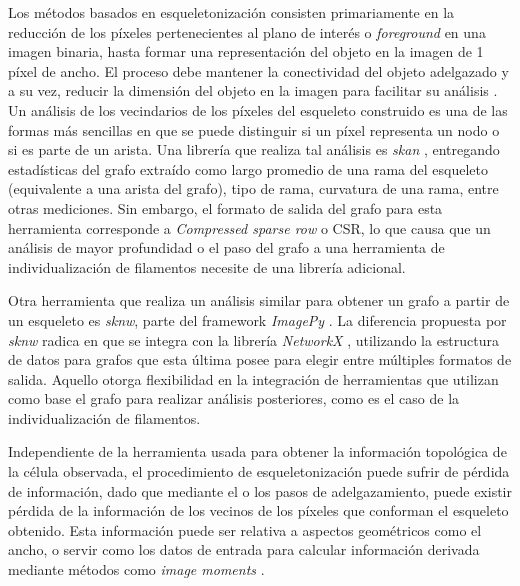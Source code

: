 Los m\'etodos basados en esqueletonizaci\'on consisten primariamente en la reducci\'on de los p\'ixeles pertenecientes al plano de inter\'es o {\it foreground} en una imagen binaria, hasta formar una representaci\'on del objeto en la imagen de 1 p\'ixel de ancho. El proceso debe mantener la conectividad del objeto adelgazado y a su vez, reducir la dimensi\'on del objeto en la imagen para facilitar su an\'alisis \citep{saha2017skeletonization}. Un an\'alisis de los vecindarios de los p\'ixeles del esqueleto construido es una de las formas m\'as sencillas en que se puede distinguir si un p\'ixel representa un nodo o si es parte de un arista. Una librer\'ia que realiza tal an\'alisis es {\it skan} \citep{nunez2018new}, entregando estad\'isticas del grafo extra\'ido como largo promedio de una rama del esqueleto (equivalente a una arista del grafo), tipo de rama, curvatura de una rama, entre otras mediciones. Sin embargo, el formato de salida del grafo para esta herramienta corresponde a {\it Compressed sparse row} o CSR, lo que causa que un an\'alisis de mayor profundidad o el paso del grafo a una herramienta de individualizaci\'on de filamentos necesite de una librer\'ia adicional. 


Otra herramienta que realiza un an\'alisis similar para obtener un grafo a partir de un esqueleto es {\it sknw}, parte del framework {\it ImagePy} \citep{wang2018imagepy}. La diferencia propuesta por {\it sknw} radica en que se integra con la librer\'ia {\it NetworkX} \citep{hagberg2008exploring}, utilizando la estructura de datos para grafos que esta \'ultima posee para elegir entre m\'ultiples formatos de salida. Aquello otorga flexibilidad en la integraci\'on de herramientas que utilizan como base el grafo para realizar an\'alisis posteriores, como es el caso de la individualizaci\'on de filamentos.


Independiente de la herramienta usada para obtener la informaci\'on topol\'ogica de la c\'elula observada, el procedimiento de esqueletonizaci\'on puede sufrir de p\'erdida de informaci\'on, dado que mediante el o los pasos de adelgazamiento, puede existir p\'erdida de la informaci\'on de los vecinos de los p\'ixeles que conforman el esqueleto obtenido. Esta informaci\'on puede ser relativa a aspectos geom\'etricos como el ancho, o servir como los datos de entrada para calcular informaci\'on derivada mediante m\'etodos como {\it image moments} \citep{flusser2009moments, chaumette2004image}.

